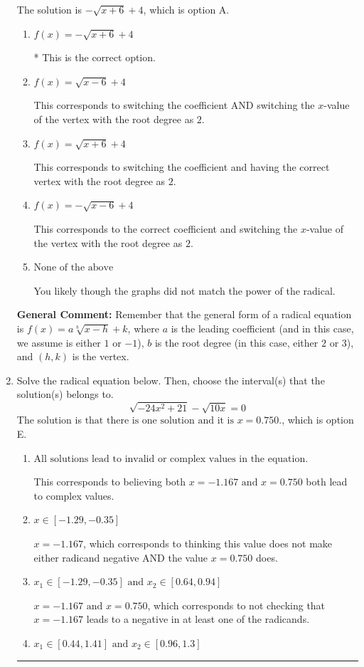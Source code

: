 \documentclass{extbook}[14pt]
\newcommand{\litem}[1]{\item #1

\rule{\textwidth}{0.4pt}}
\begin{document}
\begin{enumerate}
{The solution is \( - \sqrt{x + 6} + 4 \), which is option A.\begin{enumerate}[label=\Alph*.]
\item \( f(x) = - \sqrt{x + 6} + 4 \)

* This is the correct option.
\item \( f(x) = \sqrt{x - 6} + 4 \)

This corresponds to switching the coefficient AND switching the $x$-value of the vertex with the root degree as $2$.
\item \( f(x) = \sqrt{x + 6} + 4 \)

This corresponds to switching the coefficient and having the correct vertex with the root degree as $2$.
\item \( f(x) = - \sqrt{x - 6} + 4 \)

This corresponds to the correct coefficient and switching the $x$-value of the vertex with the root degree as $2$.
\item \( \text{None of the above} \)

You likely though the graphs did not match the power of the radical.
\end{enumerate}

\textbf{General Comment:} Remember that the general form of a radical equation is $ f(x) = a \sqrt[b]{x - h} + k$, where $a$ is the leading coefficient (and in this case, we assume is either $1$ or $-1$), $b$ is the root degree (in this case, either $2$ or $3$), and $(h, k)$ is the vertex.
}
\litem{
Solve the radical equation below. Then, choose the interval(s) that the solution(s) belongs to.
\[ \sqrt{-24 x^2 + 21} - \sqrt{10 x} = 0 \]The solution is \( \text{that there is one solution and it is } x = 0.750. \), which is option E.\begin{enumerate}[label=\Alph*.]
\item \( \text{All solutions lead to invalid or complex values in the equation.} \)

This corresponds to believing both $x = -1.167 \text{ and } x = 0.750$ both lead to complex values.
\item \( x \in [-1.29,-0.35] \)

$x = -1.167$, which corresponds to thinking this value does not make either radicand negative AND the value $x = 0.750$ does.
\item \( x_1 \in [-1.29, -0.35] \text{ and } x_2 \in [0.64,0.94] \)

$x = -1.167 \text{ and } x = 0.750$, which corresponds to not checking that $x = -1.167$ leads to a negative in at least one of the radicands.
\item \( x_1 \in [0.44, 1.41] \text{ and } x_2 \in [0.96,1.3] \)


\end{enumerate}}
\end{enumerate}
\end{document}
